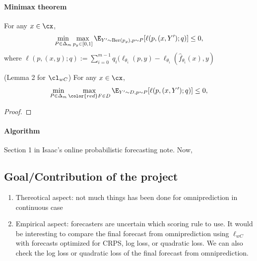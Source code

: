 \paragraph{Minimax theorem}
\begin{lemma}
    For any $x \in \cx$, 
    \[
    \min_{P \in \Delta_m} \max_{p_y \in [0,1]} \E_{Y'\sim\text{Ber}(p_y), p\sim P}[\ell(p, (x,Y'); q)] \leq 0,
    \]
    where $\ell(p, (x,y);q) := \sum_{i=0}^{m-1} q_i(\ell_{\theta_i}(p,y) - \ell_{\theta_i}(\hat{f}_{\theta_i}(x),y)$
\end{lemma}
\begin{lemma}(Lemma 2 for $\cl_{wC}$)
    For any $x \in \cx$, 
    \[
    \min_{P \in \Delta_m} \max_{\color{red} F \in D} \E_{Y'\sim D, p\sim P}[\ell(p, (x,Y'); q)] \leq 0,
    \]
\end{lemma}
\begin{proof}
\end{proof}


\paragraph{Algorithm}
Section 1 in Isaac's online probabilistic forecasting note. Now, 

\subsection{Goal/Contribution of the project}
\begin{enumerate}
    \item Thereotical aspect: not much things has been done for omniprediction in continuous case
    \item Empirical aspect: forecasters are uncertain which scoring rule to use. It would be interesting to compare the final forecast from omniprediction using $\ell_{wC}$ with forecasts optimized for CRPS, log loss, or quadratic loss. We can also check the log loss or quadratic loss of the final forecast from omniprediction. 
\end{enumerate}